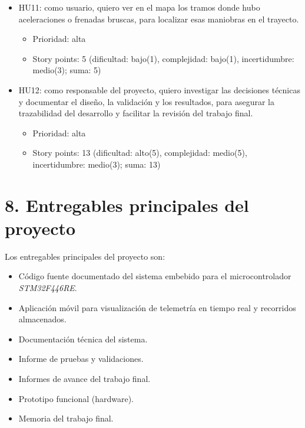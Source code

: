 \documentclass[
11pt, %
]{charter}
\begin{document}
\begin{itemize}
    \begin{itemize}
      \item Prioridad: media
      \item Story points: 5 (dificultad: bajo(1), complejidad: bajo(1), incertidumbre: medio(3); suma: 5)
    \end{itemize}
    \item HU11: como usuario, quiero ver en el mapa los tramos donde hubo aceleraciones o frenadas bruscas, para localizar esas maniobras en el trayecto.
    \begin{itemize}
      \item Prioridad: alta
      \item Story points: 5 (dificultad: bajo(1), complejidad: bajo(1), incertidumbre: medio(3); suma: 5)
    \end{itemize}
    \item HU12: como responsable del proyecto, quiero investigar las decisiones técnicas y documentar el diseño, la validación y los resultados, para asegurar la trazabilidad del desarrollo y facilitar la revisión del trabajo final.
    \begin{itemize}
      \item Prioridad: alta
      \item Story points: 13 (dificultad: alto(5), complejidad: medio(5), incertidumbre: medio(3); suma: 13)
    \end{itemize}
\end{itemize}

\section{8. Entregables principales del proyecto}
\label{sec:entregables}

Los entregables principales del proyecto son:

\begin{itemize}
	\item Código fuente documentado del sistema embebido para el microcontrolador \textit{STM32F446RE}.
	\item Aplicación móvil para visualización de telemetría en tiempo real y recorridos almacenados.
    \item Documentación técnica del sistema.
    \item Informe de pruebas y validaciones.
    \item Informes de avance del trabajo final.
    \item Prototipo funcional (hardware).
	\item Memoria del trabajo final.
\end{itemize}
\end{document}
